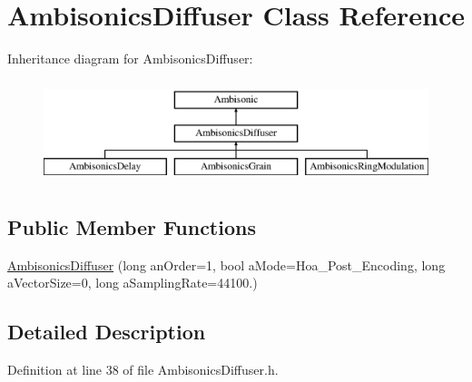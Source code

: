 \hypertarget{class_ambisonics_diffuser}{\section{Ambisonics\-Diffuser Class Reference}
\label{class_ambisonics_diffuser}
}
Inheritance diagram for Ambisonics\-Diffuser\-:\begin{figure}[H]
\begin{center}
\leavevmode
\includegraphics[height=3.000000cm]{class_ambisonics_diffuser}
\end{center}
\end{figure}
\subsection*{Public Member Functions}
\begin{DoxyCompactItemize}
\item 
\hyperlink{class_ambisonics_diffuser_a3cb3d33fc7fc15d85b337860c2a0fc34}{Ambisonics\-Diffuser} (long an\-Order=1, bool a\-Mode=Hoa\-\_\-\-Post\-\_\-\-Encoding, long a\-Vector\-Size=0, long a\-Sampling\-Rate=44100.)
\end{DoxyCompactItemize}


\subsection{Detailed Description}


Definition at line 38 of file Ambisonics\-Diffuser.\-h.




